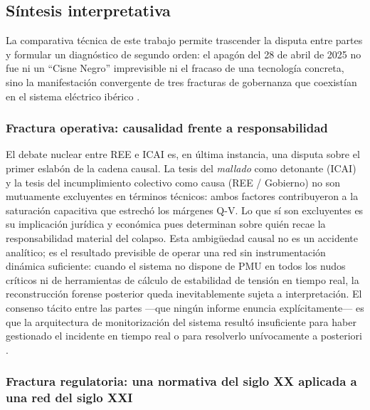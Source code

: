 \subsection*{Síntesis interpretativa}

La comparativa técnica de este trabajo permite trascender la disputa
entre partes y formular un diagnóstico de segundo orden: el apagón
del 28 de abril de 2025 no fue ni un ``Cisne Negro'' imprevisible
ni el fracaso de una tecnología concreta, sino la manifestación
convergente de tres fracturas de gobernanza que coexistían en el
sistema eléctrico ibérico
\cite{gobierno2025,icai2025,entsoe2025,mitceepr2025,blackswan2025}.

\subsubsection*{Fractura operativa: causalidad frente a responsabilidad}

El debate nuclear entre REE e ICAI es, en última instancia, una
disputa sobre el primer eslabón de la cadena causal. La tesis del
\textit{mallado} como detonante (ICAI) y la tesis del incumplimiento
colectivo como causa (REE / Gobierno) no son mutuamente excluyentes
en términos técnicos: ambos factores contribuyeron a la
saturación capacitiva que estrechó los márgenes Q-V. Lo que sí son
excluyentes es su implicación jurídica y económica pues determinan
sobre quién recae la responsabilidad material del colapso. Esta
ambigüedad causal no es un accidente analítico; es el resultado
previsible de operar una red sin instrumentación dinámica suficiente:
cuando el sistema no dispone de PMU en todos los nudos críticos ni
de herramientas de cálculo de estabilidad de tensión en tiempo real,
la reconstrucción forense posterior queda inevitablemente sujeta a
interpretación. El consenso tácito entre las partes ---que ningún
informe enuncia explícitamente--- es que la arquitectura de
monitorización del sistema resultó insuficiente para haber gestionado
el incidente en tiempo real o para resolverlo unívocamente a
posteriori \cite{ree2025,icai2025,entsoe2025}.

\subsubsection*{Fractura regulatoria: una normativa del siglo XX
aplicada a una red del siglo XXI}

